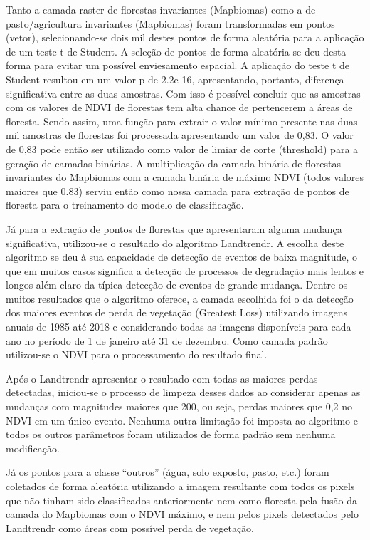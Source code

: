 \documentclass[12pt,a4paper]{article}
\begin{document}
Tanto a camada raster de florestas invariantes (Mapbiomas) como a de pasto/agricultura invariantes (Mapbiomas) foram transformadas em pontos (vetor), selecionando-se dois mil destes pontos de forma aleatória para a aplicação de um teste t de Student. A seleção de pontos de forma aleatória se deu desta forma para evitar um possível enviesamento espacial. A aplicação do teste t de Student resultou em um valor-p de 2.2e-16, apresentando, portanto, diferença significativa entre as duas amostras. Com isso é possível concluir que as amostras com os valores de NDVI de florestas tem alta chance de pertencerem a áreas de floresta. Sendo assim, uma função para extrair o valor mínimo presente nas duas mil amostras de florestas foi processada apresentando um valor de 0,83. O valor de 0,83 pode então ser utilizado como valor de limiar de corte (threshold) para a geração de camadas binárias. A multiplicação da camada binária de florestas invariantes do Mapbiomas com a camada binária de máximo NDVI (todos valores maiores que 0.83) serviu então como nossa camada para extração de pontos de floresta para o treinamento do modelo de classificação.

Já para a extração de pontos de florestas que apresentaram alguma mudança significativa, utilizou-se o resultado do algoritmo Landtrendr. A escolha deste algoritmo se deu à sua capacidade de detecção de eventos de baixa magnitude, o que em muitos casos significa a detecção de processos de degradação mais lentos e longos além claro da típica detecção de eventos de grande mudança. Dentre os muitos resultados que o algoritmo oferece, a camada escolhida foi o da detecção dos maiores eventos de perda de vegetação (Greatest Loss) utilizando imagens anuais de 1985 até 2018 e considerando todas as imagens disponíveis para cada ano no período de 1 de janeiro até 31 de dezembro. Como camada padrão utilizou-se o NDVI para o processamento do resultado final.

Após o Landtrendr apresentar o resultado com todas as maiores perdas detectadas, iniciou-se o processo de limpeza desses dados ao considerar apenas as mudanças com magnitudes maiores que 200, ou seja, perdas maiores que 0,2 no NDVI em um único evento. Nenhuma outra limitação foi imposta ao algoritmo e todos os outros parâmetros foram utilizados de forma padrão sem nenhuma modificação.

Já os pontos para a classe “outros” (água, solo exposto, pasto, etc.) foram coletados de forma aleatória utilizando a imagem resultante com todos os pixels que não tinham sido classificados anteriormente nem como floresta pela fusão da camada do Mapbiomas com o NDVI máximo, e nem pelos pixels detectados pelo Landtrendr como áreas com possível perda de vegetação.
\end{document}
